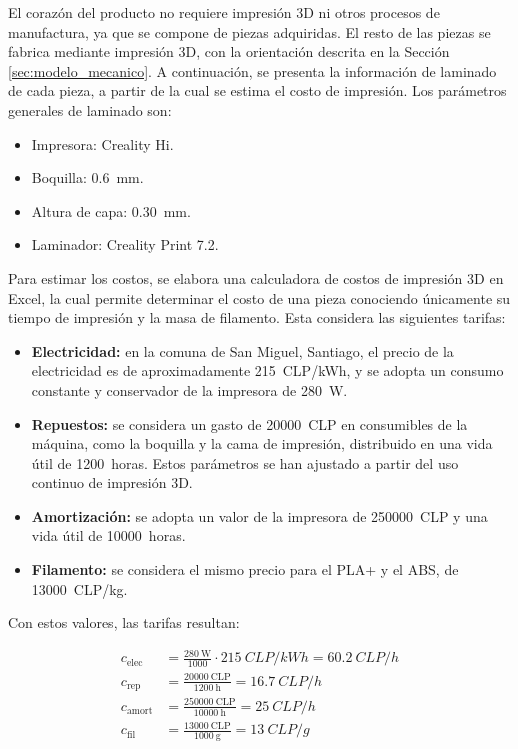 \documentclass[12pt, a4paper]{article}
\begin{document}
El corazón del producto no requiere impresión 3D ni otros procesos de manufactura, ya que se compone de piezas adquiridas. El resto de las piezas se fabrica mediante impresión 3D, con la orientación descrita en la Sección \ref{sec:modelo_mecanico}. A continuación, se presenta la información de laminado de cada pieza, a partir de la cual se estima el costo de impresión. Los parámetros generales de laminado son:

\begin{itemize}
    \item Impresora: Creality Hi.
    \item Boquilla: \SI{0,6}{\mm}.
    \item Altura de capa: \SI{0,30}{\mm}.
    \item Laminador: Creality Print 7.2.
\end{itemize}

Para estimar los costos, se elabora una calculadora de costos de impresión 3D en Excel, la cual permite determinar el costo de una pieza conociendo únicamente su tiempo de impresión y la masa de filamento. Esta considera las siguientes tarifas:

\begin{itemize}
    \item \textbf{Electricidad:} en la comuna de San Miguel, Santiago, el precio de la electricidad es de aproximadamente \SI{215}{CLP/kWh}, y se adopta un consumo constante y conservador de la impresora de \SI{280}{\watt}.
    \item \textbf{Repuestos:} se considera un gasto de \num{20000}~CLP en consumibles de la máquina, como la boquilla y la cama de impresión, distribuido en una vida útil de \num{1200}~horas. Estos parámetros se han ajustado a partir del uso continuo de impresión 3D.
    \item \textbf{Amortización:} se adopta un valor de la impresora de \num{250000}~CLP y una vida útil de \num{10000}~horas.
    \item \textbf{Filamento:} se considera el mismo precio para el PLA+ y el ABS, de \num{13000}~CLP/kg.
\end{itemize}

Con estos valores, las tarifas resultan:

\begin{align}
    c_{\text{elec}} &= \frac{\SI{280}{\watt}}{1000} \cdot \SI{215}{CLP/kWh} = \SI{60,2}{CLP/h} \\
    c_{\text{rep}} &= \frac{\num{20000}~\text{CLP}}{\SI{1200}{\hour}} = \SI{16,7}{CLP/h} \\
    c_{\text{amort}} &= \frac{\num{250000}~\text{CLP}}{\SI{10000}{\hour}} = \SI{25}{CLP/h} \\
    c_{\text{fil}} &= \frac{\num{13000}~\text{CLP}}{\SI{1000}{\gram}} = \SI{13}{CLP/g}
\end{align}
\end{document}
